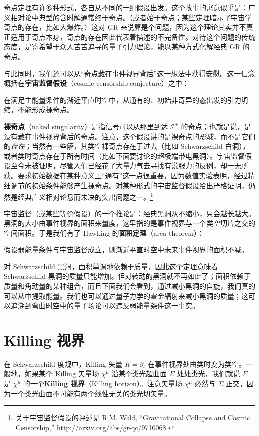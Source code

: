 奇点定理有许多种形式，各自从不同的一组假设出发。这个故事的寓意似乎是：广义相对论中典型的含时解通常终于奇点。（或者始于奇点；某些定理暗示了宇宙学奇点的存在，比如大爆炸。）这对 GR 来说算是个问题，因为这个理论其实并不真正适用于奇点本身，奇点的存在因此代表着描述的不完备性。对待这个问题的传统态度，是寄希望于众人苦苦追寻的量子引力理论，能以某种方式化解经典 GR 的奇点。

与此同时，我们还可以从“奇点藏在事件视界背后”这一想法中获得安慰。这一信念概括在\textbf{宇宙监督假设}（cosmic censorship conjecture）之中：

在满足主能量条件的渐近平直时空中，从通有的、初始非奇异的态出发的引力坍缩，不能形成裸奇点。

\textbf{裸奇点}（naked singularity）是指信号可以从那里到达 $\mathscr{I}^{+}$ 的奇点；也就是说，是没有藏在事件视界背后的奇点。注意，这个假设讲的是裸奇点的\emph{形成}，而不是它们的\emph{存在}；当然有一些解，其类空裸奇点存在于过去（比如 Schwarzschild 白洞），或者类时奇点存在于所有时间（比如下面要讨论的超极端带电黑洞）。宇宙监督假设至今未被证明，尽管人们已经花了大量力气去寻找有说服力的反例，却一无所获。要求初始数据在某种意义上“通有”这一点很重要，因为数值实验表明，经过精细调节的初始条件能够产生裸奇点。对某种形式的宇宙监督假设给出严格证明，仍然是经典广义相对论悬而未决的突出问题之一。\footnote{关于宇宙监督假设的评述见 R.M. Wald, “Gravitational Collapse and Cosmic Censorship,” http://arxiv.org/abs/gr-qc/9710068.}

宇宙监督（或某些等价假设）的一个推论是：经典黑洞从不缩小，只会越长越大。黑洞的大小由事件视界的面积来量度，这里指的是事件视界与一个类空切片之交的空间面积。于是我们有了 Hawking 的\textbf{面积定理}（area theorem）：

假设弱能量条件与宇宙监督成立，则渐近平直时空中未来事件视界的面积不减。

对 Schwarzschild 黑洞，面积单调地依赖于质量，因此这个定理意味着 Schwarzschild 黑洞的质量只能增加。但对转动的黑洞就不再如此了；面积依赖于质量和角动量的某种组合，而且下面我们会看到，通过减小黑洞的自旋，我们真的可以从中提取能量。我们也可以通过量子力学的霍金辐射来减小黑洞的质量；这可以追溯到弯曲时空中的量子场论可以违反弱能量条件这一事实。

\section{Killing 视界}

在 Schwarzschild 度规中，Killing 矢量 $K=\partial_t$ 在事件视界处由类时变为类空。一般地，如果某个 Killing 矢量场 $\chi^{\mu}$ 沿某个类光超曲面 $\Sigma$ 处处类光，我们就说 $\Sigma$ 是 $\chi^{\mu}$ 的一个\textbf{Killing 视界}（Killing horizon）。注意矢量场 $\chi^{\mu}$ 必然与 $\Sigma$ 正交，因为一个类光曲面不可能有两个线性无关的类光切矢量。

